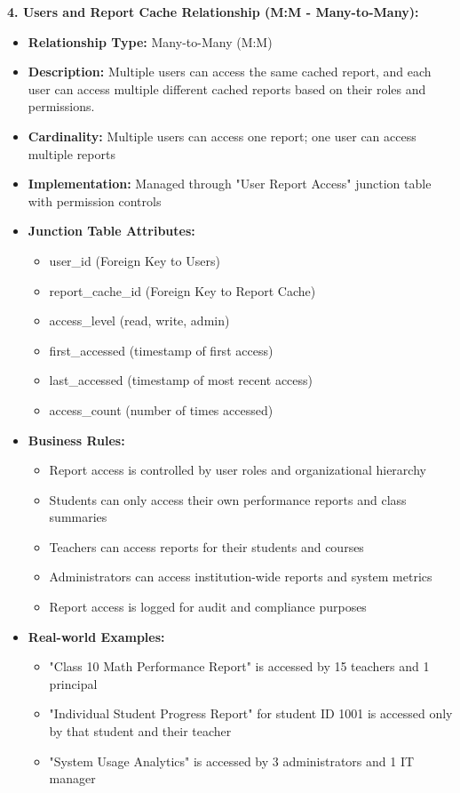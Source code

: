 \documentclass[12pt,a4paper,oneside]{book}
\begin{document}
\textbf{4. Users and Report Cache Relationship (M:M - Many-to-Many):}
\begin{itemize}
    \item \textbf{Relationship Type:} Many-to-Many (M:M)
    \item \textbf{Description:} Multiple users can access the same cached report, and each user can access multiple different cached reports based on their roles and permissions.
    \item \textbf{Cardinality:} Multiple users can access one report; one user can access multiple reports
    \item \textbf{Implementation:} Managed through "User Report Access" junction table with permission controls
    \item \textbf{Junction Table Attributes:}
        \begin{itemize}
            \item user\_id (Foreign Key to Users)
            \item report\_cache\_id (Foreign Key to Report Cache)
            \item access\_level (read, write, admin)
            \item first\_accessed (timestamp of first access)
            \item last\_accessed (timestamp of most recent access)
            \item access\_count (number of times accessed)
        \end{itemize}
    \item \textbf{Business Rules:}
        \begin{itemize}
            \item Report access is controlled by user roles and organizational hierarchy
            \item Students can only access their own performance reports and class summaries
            \item Teachers can access reports for their students and courses
            \item Administrators can access institution-wide reports and system metrics
            \item Report access is logged for audit and compliance purposes
        \end{itemize}
    \item \textbf{Real-world Examples:}
        \begin{itemize}
            \item "Class 10 Math Performance Report" is accessed by 15 teachers and 1 principal
            \item "Individual Student Progress Report" for student ID 1001 is accessed only by that student and their teacher
            \item "System Usage Analytics" is accessed by 3 administrators and 1 IT manager
        \end{itemize}
\end{itemize}
\end{document}
